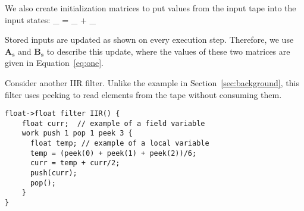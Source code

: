We also create initialization matrices to put values from the input
tape into the input states:
\starteqnstar
{}_ =  _ +
 _
\doneeqnstar

Stored inputs are updated as shown on every execution step.
Therefore, we use $\mathbf{A_s}$ and $\mathbf{B_s}$ to describe this
update, where the values of these two matrices are given in
Equation~\ref{eq:one}.


Consider another IIR filter.  Unlike the example in
Section~\ref{sec:background}, this filter uses peeking to read
elements from the tape without consuming them.

\begin{singlespace}
\small
\begin{verbatim}
float->float filter IIR() {
    float curr;  // example of a field variable
    work push 1 pop 1 peek 3 {
      float temp; // example of a local variable
      temp = (peek(0) + peek(1) + peek(2))/6;
      curr = temp + curr/2;
      push(curr);
      pop();
    }
}
\end{verbatim}
\end{singlespace}
\vspace{-16pt}

